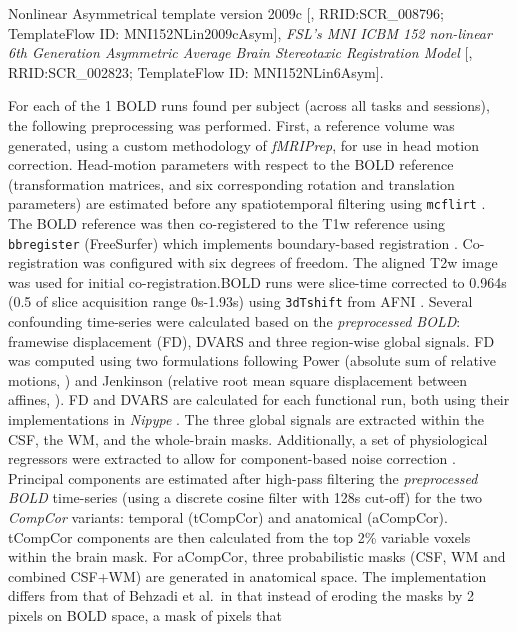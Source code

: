 \documentclass[
]{article}
\begin{document}
\begin{description}
{Nonlinear Asymmetrical template version 2009c}
{[}\citet{mni152nlin2009casym}, RRID:SCR\_008796; TemplateFlow ID:
MNI152NLin2009cAsym{]}, \emph{FSL's MNI ICBM 152 non-linear 6th
Generation Asymmetric Average Brain Stereotaxic Registration Model}
{[}\citet{mni152nlin6asym}, RRID:SCR\_002823; TemplateFlow ID:
MNI152NLin6Asym{]}.
\item[Functional data preprocessing]
For each of the 1 BOLD runs found per subject (across all tasks and
sessions), the following preprocessing was performed. First, a reference
volume was generated, using a custom methodology of \emph{fMRIPrep}, for
use in head motion correction. Head-motion parameters with respect to
the BOLD reference (transformation matrices, and six corresponding
rotation and translation parameters) are estimated before any
spatiotemporal filtering using \texttt{mcflirt} \citep[FSL
,][]{mcflirt}. The BOLD reference was then co-registered to the T1w
reference using \texttt{bbregister} (FreeSurfer) which implements
boundary-based registration \citep{bbr}. Co-registration was configured
with six degrees of freedom. The aligned T2w image was used for initial
co-registration.BOLD runs were slice-time corrected to 0.964s (0.5 of
slice acquisition range 0s-1.93s) using \texttt{3dTshift} from AFNI
\citep[RRID:SCR\_005927]{afni}. Several confounding time-series were
calculated based on the \emph{preprocessed BOLD}: framewise displacement
(FD), DVARS and three region-wise global signals. FD was computed using
two formulations following Power (absolute sum of relative motions,
\citet{power_fd_dvars}) and Jenkinson (relative root mean square
displacement between affines, \citet{mcflirt}). FD and DVARS are
calculated for each functional run, both using their implementations in
\emph{Nipype} \citep[following the definitions by][]{power_fd_dvars}.
The three global signals are extracted within the CSF, the WM, and the
whole-brain masks. Additionally, a set of physiological regressors were
extracted to allow for component-based noise correction
\citep[\emph{CompCor},][]{compcor}. Principal components are estimated
after high-pass filtering the \emph{preprocessed BOLD} time-series
(using a discrete cosine filter with 128s cut-off) for the two
\emph{CompCor} variants: temporal (tCompCor) and anatomical (aCompCor).
tCompCor components are then calculated from the top 2\% variable voxels
within the brain mask. For aCompCor, three probabilistic masks (CSF, WM
and combined CSF+WM) are generated in anatomical space. The
implementation differs from that of Behzadi et al.~in that instead of
eroding the masks by 2 pixels on BOLD space, a mask of pixels that

\end{description}
\end{document}
